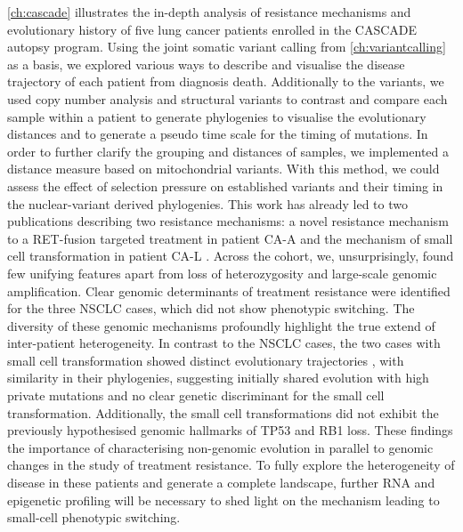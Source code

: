 \autoref{ch:cascade} illustrates the in-depth analysis of resistance mechanisms and evolutionary history of five lung cancer patients enrolled in the CASCADE autopsy program. Using the joint somatic variant calling from \autoref{ch:variantcalling} as a basis, we explored various ways to describe and visualise the disease trajectory of each patient from diagnosis  death. Additionally to the variants, we used copy number analysis and structural variants to contrast and compare each sample within a patient to generate phylogenies to visualise the evolutionary distances and to generate a pseudo time scale for the timing of mutations. In order to further clarify the grouping and distances of samples, we implemented a distance measure based on mitochondrial variants. With this method, we could assess the effect of selection pressure on established variants and their timing in the nuclear-variant derived phylogenies. This work has already led to two publications describing two resistance mechanisms: a novel resistance mechanism to a RET-fusion targeted treatment in patient CA-A \cite{Solomon2020} and the mechanism of small cell transformation in patient CA-L \cite{Burr2019}. Across the cohort, we, unsurprisingly, found few unifying features apart from loss of heterozygosity and large-scale genomic amplification. Clear genomic determinants of treatment resistance were identified for the three NSCLC cases, which did not show phenotypic switching. The diversity of these genomic mechanisms  profoundly highlight the true extend of inter-patient heterogeneity. In contrast to the NSCLC cases, the two cases with small cell transformation showed distinct evolutionary trajectories , with similarity in their  phylogenies, suggesting initially shared evolution with high private mutations and no clear genetic discriminant for the small cell transformation. Additionally, the small cell transformations did not exhibit the previously hypothesised genomic hallmarks of TP53 and RB1 loss. These findings  the importance of characterising non-genomic evolution in parallel to genomic changes in the study of treatment resistance. To fully explore the heterogeneity of disease in these patients and generate a complete landscape, further RNA and epigenetic profiling will be necessary to shed light on the mechanism leading to small-cell phenotypic switching.

